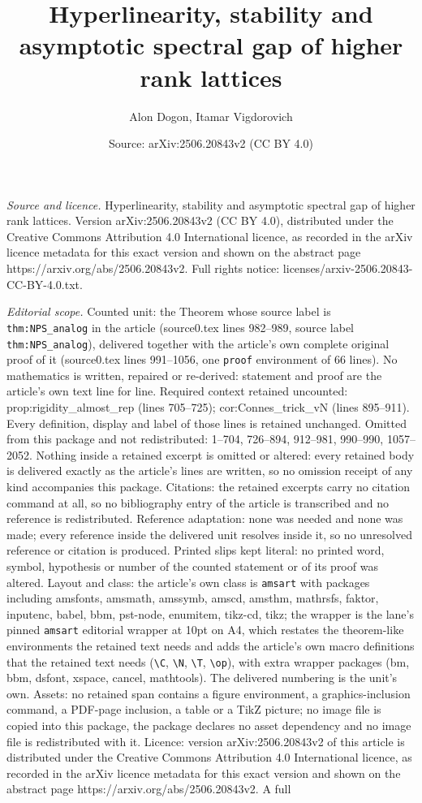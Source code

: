 \documentclass[10pt,a4paper]{amsart}
\title[Hyperlinearity, stability and asymptotic spectral gap of hig]{Hyperlinearity, stability and asymptotic spectral gap of higher rank lattices}
\author{Alon Dogon, Itamar Vigdorovich}
\date{Source: arXiv:2506.20843v2 (CC BY 4.0)}
\begin{document}
\maketitle

\noindent\emph{Source and licence.} Hyperlinearity, stability and asymptotic spectral gap of higher rank lattices. Version arXiv:2506.20843v2 (CC BY 4.0), distributed under the Creative Commons Attribution 4.0 International licence, as recorded in the arXiv licence metadata for this exact version and shown on the abstract page https://arxiv.org/abs/2506.20843v2. Full rights notice: licenses/arxiv-2506.20843-CC-BY-4.0.txt.\par\smallskip

\noindent\textit{Editorial scope.} Counted unit: the Theorem whose source label is \texttt{thm:NPS\_analog} in the article (source0.tex lines 982--989, source label \texttt{thm:NPS\_analog}), delivered together with the article's own complete original proof of it (source0.tex lines 991--1056, one \texttt{proof} environment of 66 lines). No mathematics is written, repaired or re-derived: statement and proof are the article's own text line for line. Required context retained uncounted: prop:rigidity\_almost\_rep (lines 705--725); cor:Connes\_trick\_vN (lines 895--911). Every definition, display and label of those lines is retained unchanged. Omitted from this package and not redistributed: 1--704, 726--894, 912--981, 990--990, 1057--2052. Nothing inside a retained excerpt is omitted or altered: every retained body is delivered exactly as the article's lines are written, so no omission receipt of any kind accompanies this package. Citations: the retained excerpts carry no citation command at all, so no bibliography entry of the article is transcribed and no reference is redistributed. Reference adaptation: none was needed and none was made; every reference inside the delivered unit resolves inside it, so no unresolved reference or citation is produced. Printed slips kept literal: no printed word, symbol, hypothesis or number of the counted statement or of its proof was altered. Layout and class: the article's own class is \texttt{amsart} with packages including amsfonts, amsmath, amssymb, amscd, amsthm, mathrsfs, faktor, inputenc, babel, bbm, pst-node, enumitem, tikz-cd, tikz; the wrapper is the lane's pinned \texttt{amsart} editorial wrapper at 10pt on A4, which restates the theorem-like environments the retained text needs and adds the article's own macro definitions that the retained text needs (\texttt{\textbackslash C}, \texttt{\textbackslash N}, \texttt{\textbackslash T}, \texttt{\textbackslash op}), with extra wrapper packages (bm, bbm, dsfont, xspace, cancel, mathtools). The delivered numbering is the unit's own. Assets: no retained span contains a figure environment, a graphics-inclusion command, a PDF-page inclusion, a table or a TikZ picture; no image file is copied into this package, the package declares no asset dependency and no image file is redistributed with it. Licence: version arXiv:2506.20843v2 of this article is distributed under the Creative Commons Attribution 4.0 International licence, as recorded in the arXiv licence metadata for this exact version and shown on the abstract page https://arxiv.org/abs/2506.20843v2. A full 
\end{document}
